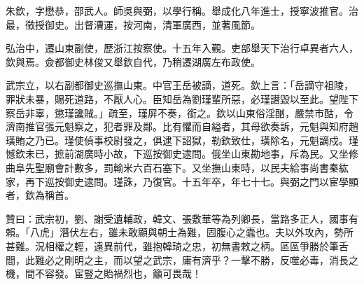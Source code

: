 \begin{pinyinscope}
朱欽，字懋恭，邵武人。師吳與弼，以學行稱。舉成化八年進士，授寧波推官。治最，徵授御史。出督漕運，按河南，清軍廣西，並著風節。

弘治中，遷山東副使，歷浙江按察使。十五年入覲。吏部舉天下治行卓異者六人，欽與焉。僉都御史林俊又舉欽自代，乃稍遷湖廣左布政使。

武宗立，以右副都御史巡撫山東。中官王岳被謫，道死。欽上言：「岳謫守祖陵，罪狀未暴，賜死道路，不厭人心。臣知岳為劉瑾輩所惡，必瑾譖毀以至此。望陛下察岳非辜，懲瑾讒賊。」疏至，瑾屏不奏，銜之。欽以山東俗淫酗，嚴禁市酤，令濟南推官張元魁察之，犯者罪及鄰。比有懼而自縊者，其母欲奏訴，元魁與知府趙璜賄之乃已。瑾使偵事校尉發之，俱逮下詔獄，勒欽致仕，璜除名，元魁謫戍。瑾憾欽未已，摭前湖廣時小故，下巡按御史逮問。俄坐山東勘地事，斥為民。又坐修曲阜先聖廟會計數多，罰輸米六百石塞下。又坐撫山東時，以民夫給事尚書秦紘家，再下巡按御史逮問。瑾誅，乃復官。十五年卒，年七十七。與弼之門以宦學顯者，欽為稱首。

贊曰：武宗初，劉、謝受遺輔政，韓文、張敷華等為列卿長，當路多正人，國事有賴。「八虎」潛伏左右，雖未敢顯與朝士為難，固腹心之蠹也。夫以外攻內，勢所甚難。況相權之輕，遠異前代，雖抱韓琦之忠，初無書敕之柄。區區爭勝於筆舌間，此難必之剛明之主，而以望之武宗，庸有濟乎？一擊不勝，反噬必毒，消長之機，間不容發。宦豎之貽禍烈也，籲可畏哉！


\end{pinyinscope}